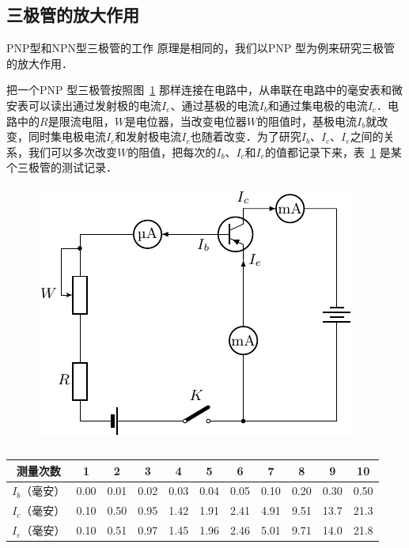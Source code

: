 \subsection{三极管的放大作用}

PNP型和NPN型三极管的工作
原理是相同的，我们以PNP 型为例来研究三极管的放大作用．

把一个PNP 型三极管按照图~\ref{fig_B_8-30} 那样连接在电路中，从串联在电路中的毫安表和微安表可以读出通过发射极的电流$I_e$、通过基极的电流$I_b$和通过集电极的电流$I_c$．电路中的$R$是限流电阻，$W$是电位器，当改变电位器$W$的阻值时，基极电流$I_b$就改变，同时集电极电流$I_c$和发射极电流$I_e$也随着改变．为了研究$I_b$、$I_c$、$I_e$之间的关系，我们可以多次改变$W$的阻值，把每次的$I_b$、$I_c$和$I_e$的值都记录下来，表~\ref{tab_B_8-2} 是某个三极管的测试记录．
\begin{figure}[htbp]
    \centering
    \includegraphics{fig/B/8-30.pdf}
    \caption{}\label{fig_B_8-30}
\end{figure}

\begin{table}[htbp]
	\centering
	\caption{}\label{tab_B_8-2}
    \begin{tabular}{ccccccccccc}
        \toprule
		测量次数  & 1&2&3&4&5&6&7&8&9&10\\
		\midrule
		$I_b$（毫安）& 0.00 & 0.01 & 0.02 & 0.03 & 0.04 & 0.05 &0.10  & 0.20 & 0.30 & 0.50\\ 
		$I_c$（毫安）&  0.10  & 0.50 & 0.95 & 1.42 & 1.91 & 2.41 & 4.91 & 9.51 & 13.7 &21.3\\
		$I_e$（毫安）& 0.10 & 0.51 & 0.97 & 1.45 & 1.96 & 2.46 & 5.01 & 9.71 & 14.0 & 21.8 \\  
		\bottomrule
    \end{tabular}
\end{table}

